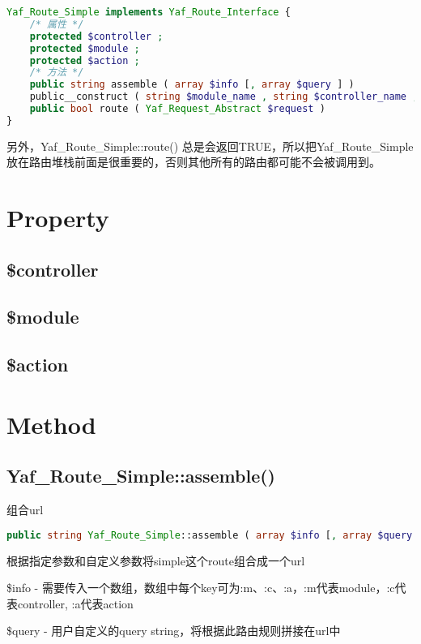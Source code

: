 \begin{lstlisting}[language=PHP]
Yaf_Route_Simple implements Yaf_Route_Interface {
    /* 属性 */
    protected $controller ;
    protected $module ;
    protected $action ;
    /* 方法 */
    public string assemble ( array $info [, array $query ] )
    public__construct ( string $module_name , string $controller_name , string $action_name )
    public bool route ( Yaf_Request_Abstract $request )
}
\end{lstlisting}


另外，Yaf\_Route\_Simple::route() 总是会返回TRUE，所以把Yaf\_Route\_Simple放在路由堆栈前面是很重要的，否则其他所有的路由都可能不会被调用到。


\section{Property}

\subsection{\$controller}


\subsection{\$module}


\subsection{\$action}


\section{Method}


\subsection{Yaf\_Route\_Simple::assemble()}

组合url





\begin{lstlisting}[language=PHP]
public string Yaf_Route_Simple::assemble ( array $info [, array $query ] )
\end{lstlisting}

根据指定参数和自定义参数将simple这个route组合成一个url

\begin{compactitem}
\item \$info - 需要传入一个数组，数组中每个key可为:m、:c、:a，:m代表module，:c代表controller, :a代表action

\item \$query - 用户自定义的query string，将根据此路由规则拼接在url中

\end{compactitem}



